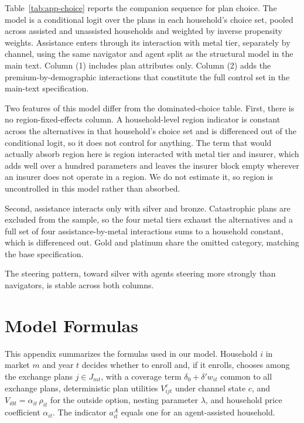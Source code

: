 \documentclass[12pt]{article}
\begin{document}
Table~\ref{tab:app-choice} reports the companion sequence for plan choice. The model is a conditional logit over the plans in each household's choice set, pooled across assisted and unassisted households and weighted by inverse propensity weights. Assistance enters through its interaction with metal tier, separately by channel, using the same navigator and agent split as the structural model in the main text. Column (1) includes plan attributes only. Column (2) adds the premium-by-demographic interactions that constitute the full control set in the main-text specification.

Two features of this model differ from the dominated-choice table. First, there is no region-fixed-effects column. A household-level region indicator is constant across the alternatives in that household's choice set and is differenced out of the conditional logit, so it does not control for anything. The term that would actually absorb region here is region interacted with metal tier and insurer, which adds well over a hundred parameters and leaves the insurer block empty wherever an insurer does not operate in a region. We do not estimate it, so region is uncontrolled in this model rather than absorbed.

Second, assistance interacts only with silver and bronze. Catastrophic plans are excluded from the sample, so the four metal tiers exhaust the alternatives and a full set of four assistance-by-metal interactions sums to a household constant, which is differenced out. Gold and platinum share the omitted category, matching the base specification.

The steering pattern, toward silver with agents steering more strongly than navigators, is stable across both columns.


\section{Model Formulas}\label{app:formulas}

This appendix summarizes the formulas used in our model.   Household $i$ in market $m$ and year $t$ decides whether to enroll and, if it enrolls, chooses among the exchange plans $j \in J_{mt}$, with a coverage term $\delta_0 + \delta' w_{it}$ common to all exchange plans, deterministic plan utilities $V^c_{ijt}$ under channel state $c$, and $V_{i0t} = \alpha_{it}\, \rho_{it}$ for the outside option, nesting parameter $\lambda$, and household price coefficient $\alpha_{it}$. The indicator $a^A_{it}$ equals one for an agent-assisted household.
\end{document}
